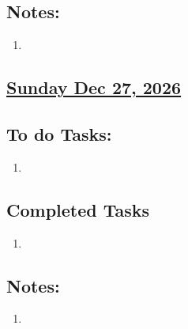 \subsection*{Notes:}
\begin{enumerate}
    \item 
\end{enumerate}
\subsection*{\underline{Sunday Dec 27, 2026}}
\subsection*{To do Tasks:}
\begin{enumerate}
    \item
\end{enumerate}
\subsection*{Completed Tasks}
\begin{enumerate}[\ding{52}]  %
    \item 
\end{enumerate}
\subsection*{Notes:}
\begin{enumerate}
    \item 
\end{enumerate}